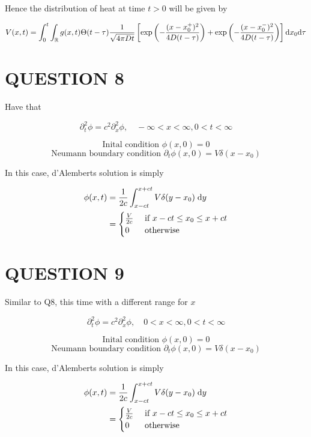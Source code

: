 \documentclass[a4paper]{article}
\begin{document}
Hence the distribution of heat at time $ t > 0 $ will be given by

\[ V(x,t) = \int_{0}^{t} \int_{\mathbb{R}} g(x,t)\Theta(t-\tau) \frac{1}{\sqrt{4 \pi D t}} \left[ \exp \left(   - \frac{(x-x_{0}^{+})^{2}}{4 D (t - \tau)} \right) + \exp \left(   - \frac{(x-x_{0}^{-})^{2}}{4 D (t - \tau)} \right)  \right]   \mathrm{d} x_{0} \mathrm{d} \tau \]






\section{QUESTION 8}

Have that 

\[ \partial_{t}^{2} \phi = c^{2} \partial_{x}^{2} \phi, \quad -\infty < x < \infty, 0 < t < \infty \]

\[ \text{Inital condition } \phi(x,0) = 0 \]
\[ \text{Neumann boundary condition } \partial_{t} \phi(x,0) = V \delta(x - x_{0}) \]

In this case, d'Alemberts solution is simply

\begin{align*}
\phi(x,t) & = \frac{1}{2c} \int_{x - ct}^{x + ct} V \delta(y - x_{0}) \; \mathrm{d} y \\
& = \begin{cases} \frac{V}{2c}  & \text{ if } x - ct \leq x_{0} \leq x + ct  \\ 0 & \text{ otherwise } \end{cases}
\end{align*}








\section{QUESTION 9}

Similar to Q8, this time with a different range for $ x $ 

\[ \partial_{t}^{2} \phi = c^{2} \partial_{x}^{2} \phi, \quad 0 < x < \infty, 0 < t < \infty\]

\[ \text{Inital condition } \phi(x,0) = 0 \]
\[ \text{Neumann boundary condition } \partial_{t} \phi(x,0) = V \delta(x - x_{0}) \]

In this case, d'Alemberts solution is simply

\begin{align*}
\phi(x,t) & = \frac{1}{2c} \int_{x - ct}^{x + ct} V \delta(y - x_{0}) \; \mathrm{d} y \\
& = \begin{cases} \frac{V}{2c}  & \text{ if } x - ct \leq x_{0} \leq x + ct  \\ 0 & \text{ otherwise } \end{cases}
\end{align*}
\end{document}

